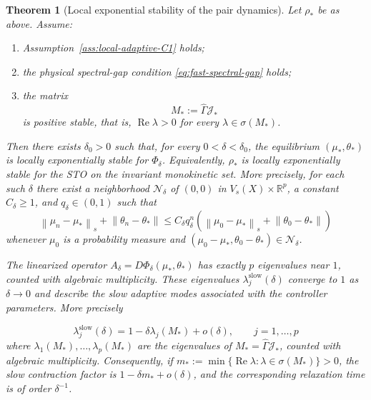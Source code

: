 \documentclass[11pt]{article}
\newtheorem{theorem}{Theorem}[section]
\theoremstyle{definition}
\theoremstyle{remark}
\newcommand{\norm}[1]{\left\lVert #1\right\rVert}
\newcommand{\R}{\mathbb{R}}
\newcommand{\Gammahat}{\widehat{\Gamma}}
\begin{document}
\begin{theorem}[Local exponential stability of the pair dynamics]
\label{thm:local-stability}
Let \(\rho_*\) be as above.  Assume:
\begin{enumerate}[label=(S\arabic*)]
  \item Assumption~\ref{ass:local-adaptive-C1} holds;
  \item the physical spectral-gap condition
        \eqref{eq:fast-spectral-gap} holds;
  \item the matrix
        \begin{equation}
          M_*:=\Gammahat\mathcal J_*
          \label{eq:effective-slow-matrix}
        \end{equation}
        is positive stable, that is,
        \(\operatorname{Re}\lambda>0\) for every
        \(\lambda\in\sigma(M_*)\).
\end{enumerate}
Then there exists \(\delta_0>0\) such that, for every
\(0<\delta<\delta_0\), the equilibrium \((\mu_*,\theta_*)\) is locally
exponentially stable for \(\Phi_\delta\).  Equivalently, \(\rho_*\) is locally
exponentially stable for the STO on the invariant monokinetic set.
More precisely, for each such \(\delta\) there exist a neighborhood
\(\mathcal N_\delta\) of \((0,0)\) in \(V_s(X)\times\R^p\), a constant
\(C_\delta\geq1\), and \(q_\delta\in(0,1)\) such that
\begin{equation}
  \norm{\mu_n-\mu_*}_s+\norm{\theta_n-\theta_*}
  \leq C_\delta q_\delta^n
  \left(
    \norm{\mu_0-\mu_*}_s+\norm{\theta_0-\theta_*}
  \right)
  \label{eq:local-exponential-stability}
\end{equation}
whenever \(\mu_0\) is a probability measure and
\((\mu_0-\mu_*,\theta_0-\theta_*)\in\mathcal N_\delta\).

The linearized operator
$A_\delta=D\Phi_\delta(\mu_*,\theta_*)$ has exactly $p$
eigenvalues near $1$, counted with algebraic multiplicity.
These eigenvalues  $\lambda_j^{\mathrm{slow}}(\delta)$  converge to $1$ as $\delta\to0$ and
describe the slow adaptive modes associated with the
controller parameters. More precisely

\begin{equation}
  \lambda_j^{\mathrm{slow}}(\delta)
  =1-\delta\lambda_j(M_*)+o(\delta),
  \qquad j=1,\ldots,p
  \label{eq:slow-multipliers}
\end{equation}
where $\lambda_1(M_*),\ldots,\lambda_p(M_*)$ are the
eigenvalues of $M_*=\widehat\Gamma\mathcal J_*$,
counted with algebraic multiplicity.
Consequently, if
\(m_*:=\min\{\operatorname{Re}\lambda:\lambda\in\sigma(M_*)\}>0\),
the slow contraction factor is
\(1-\delta m_*+o(\delta)\), and the corresponding relaxation time is of
order \(\delta^{-1}\).
\end{theorem}
\end{document}
